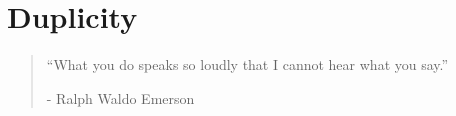 \chapter{Duplicity} %

\vspace{-1.3cm}
\begin{localsize}{10}
	\begin{quote}
		“What you do speaks so loudly that I cannot hear what you say.”
		\begin{flushright}- Ralph Waldo Emerson \end{flushright}
	\end{quote} 
\end{localsize}
\vspace{1cm}


